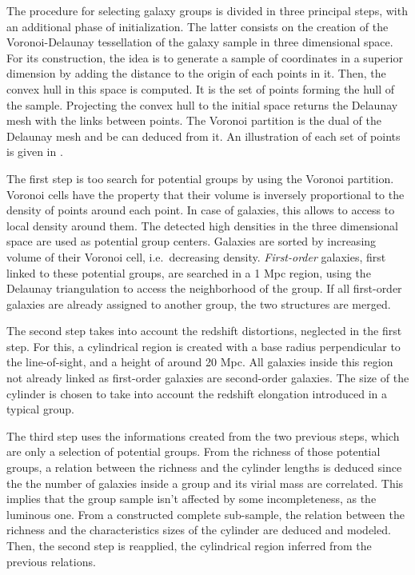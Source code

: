 The procedure for selecting galaxy groups is divided in three principal steps,
with an additional phase of initialization. The latter consists on the creation
of the Voronoi-Delaunay tessellation of the galaxy sample in three dimensional
space. For its construction, the idea is to generate a sample of coordinates in
a superior dimension by adding the distance to the origin of each points in it.
Then, the convex hull in this space is computed. It is the set of points
forming the hull of the sample. Projecting the convex hull to the initial space
returns the Delaunay mesh with the links between points. The Voronoi partition
is the dual of the Delaunay mesh and be can deduced from it. An illustration of
each set of points is given in .

The first step is too search for potential groups by using the Voronoi
partition. Voronoi cells have the property that their volume is inversely
proportional to the density of points around each point. In case of galaxies,
this allows to access to local density around them. The detected high densities
in the three dimensional space are used as potential group centers. Galaxies
are sorted by increasing volume of their Voronoi cell, i.e.\ decreasing
density. \emph{First-order} galaxies, first linked to these potential groups,
are searched in a 1 Mpc region, using the Delaunay triangulation to access the
neighborhood of the group. If all first-order galaxies are already assigned to
another group, the two structures are merged.

The second step takes into account the redshift distortions, neglected in the
first step. For this, a cylindrical region is created with a base radius
perpendicular to the line-of-sight, and a height of around 20 Mpc. All galaxies
inside this region not already linked as first-order galaxies are second-order
galaxies. The size of the cylinder is chosen to take into account the redshift
elongation introduced in a typical group.

The third step uses the informations created from the two previous steps, which
are only a selection of potential groups. From the richness of those potential
groups, a relation between the richness and the cylinder lengths is deduced
since the the number of galaxies inside a group and its virial mass are
correlated. This implies that the group sample isn't affected by some
incompleteness, as the luminous one. From a constructed complete sub-sample,
the relation between the richness and the characteristics sizes of the cylinder
are deduced and modeled. Then, the second step is reapplied, the cylindrical
region inferred from the previous relations.

